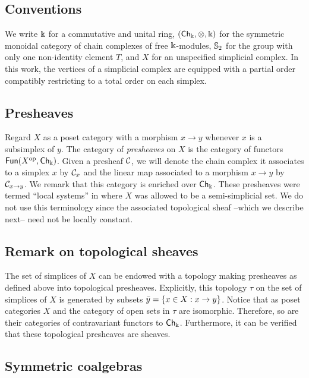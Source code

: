 
\subsection{Conventions}

We write $\Bbbk$ for a commutative and unital ring, $(\mathsf{Ch}_\Bbbk, \otimes, \Bbbk)$ for the symmetric monoidal category of chain complexes of free $\Bbbk$-modules, $\mathbb{S}_2$ for the group with only one non-identity element $T$, and $X$ for an unspecified simplicial complex.
In this work, the vertices of a simplicial complex are equipped with a partial order compatibly restricting to a total order on each simplex.

\subsection{Presheaves} \label{ss:presheaves}

Regard $X$ as a poset category with a morphism $x \to y$ whenever $x$ is a subsimplex of $y$.
The category of \textit{presheaves} on $X$ is the category of functors $\mathsf{Fun}(X^{\mathrm{op}}, \mathsf{Ch}_\Bbbk)$.
Given a presheaf $\mathcal{C}$, we will denote the chain complex it associates to a simplex $x$ by $\mathcal{C}_x$ and the linear map associated to a morphism $x \to y$ by $\mathcal{C}_{x \to y}$.
We remark that this category is enriched over $\mathsf{Ch}_\Bbbk$.
These presheaves were termed ``local systems'' in \cite{ranicki1990assembly} where $X$ was allowed to be a semi-simplicial set.
We do not use this terminology since the associated topological sheaf --which we describe next-- need not be locally constant.

\subsection{Remark on topological sheaves} \label{ss:topological sheaf}

The set of simplices of $X$ can be endowed with a topology making presheaves as defined above into topological presheaves.
Explicitly, this topology $\tau$ on the set of simplices of $X$ is generated by subsets $\bar y = \{x \in X : x \to y\}$.
Notice that as poset categories $X$ and the category of open sets in $\tau$ are isomorphic.
Therefore, so are their categories of contravariant functors to $\mathsf{Ch}_\Bbbk$.
Furthermore, it can be verified that these topological presheaves are sheaves.

\subsection{Symmetric coalgebras}


